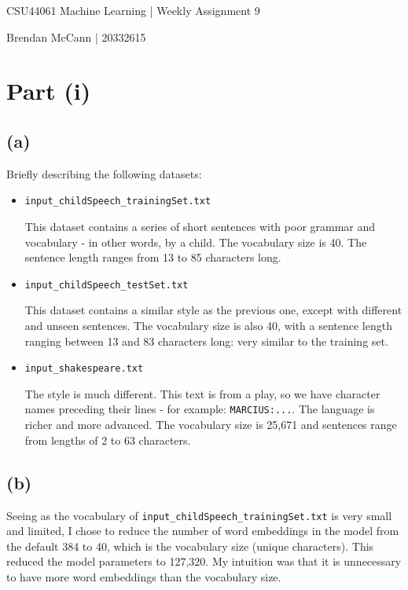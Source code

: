 \documentclass{article}  %
\begin{document}
	
	\begin{center}
		\begin{Large}
			CSU44061 Machine Learning | Weekly Assignment 9
			
			Brendan McCann | 20332615
		\end{Large}
	\end{center}
	
	\section*{Part (i)}
	
	\subsection*{(a)}
	
	Briefly describing the following datasets:
	
	\begin{itemize}
		\item \verb|input_childSpeech_trainingSet.txt|
		
		This dataset contains a series of short sentences with poor grammar and vocabulary - in other words, by a child. The vocabulary size is 40. The sentence length ranges from 13 to 85 characters long.
		
		\item \verb|input_childSpeech_testSet.txt|
		
		This dataset contains a similar style as the previous one, except with different and unseen sentences. The vocabulary size is also 40, with a sentence length ranging between 13 and 83 characters long: very similar to the training set.
		
		\item \verb|input_shakespeare.txt|
		
		The style is much different. This text is from a play, so we have character names preceding their lines - for example: \verb|MARCIUS:...|. The language is richer and more advanced. The vocabulary size is 25,671 and sentences range from lengths of 2 to 63 characters.
		
	\end{itemize}
	
	\subsection*{(b)}
	
	Seeing as the vocabulary of \verb|input_childSpeech_trainingSet.txt| is very small and limited, I chose to reduce the number of word embeddings in the model from the default 384 to 40, which is the vocabulary size (unique characters). This reduced the model parameters to 127,320. My intuition was that it is unnecessary to have more word embeddings than the vocabulary size.
	
\end{document}
